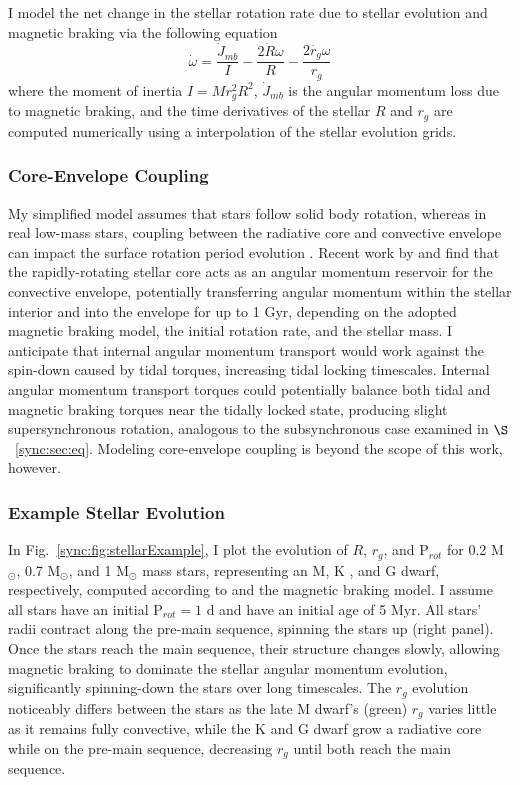 I model the net change in the stellar rotation rate due to stellar evolution and magnetic braking via the following equation 
\begin{equation} \label{sync:eqn:stellar_rot_rate_dt}
\dot{\omega} = \frac{\dot{J}_{mb}}{I} - \frac{2 \dot{R} \omega}{R} - \frac{2 \dot{r_g} \omega}{r_g}
\end{equation}
where the moment of inertia $I = M r_g^2 R^2$, $\dot{J}_{mb}$ is the angular momentum loss due to magnetic braking, and the time derivatives of the stellar $R$ and $r_g$ are computed numerically using a interpolation of the \citet{Baraffe2015} stellar evolution grids.  

\subsubsection{Core-Envelope Coupling} \label{sync:sec:methods:twoLayer}

My simplified model assumes that stars follow solid body rotation, whereas in real low-mass stars, coupling between the radiative core and convective envelope can impact the surface rotation period evolution \citep{MacGregor1991,Allain1998,Bouvier2008,Irwin2009}. Recent work by \citet{Gallet2013} and \citet{Gallet2015} find that the rapidly-rotating stellar core acts as an angular momentum reservoir for the convective envelope, potentially transferring angular momentum within the stellar interior and into the envelope for up to 1 Gyr, depending on the adopted magnetic braking model, the initial rotation rate, and the stellar mass. I anticipate that internal angular momentum transport would work against the spin-down caused by tidal torques, increasing tidal locking timescales. Internal angular momentum transport torques could potentially balance both tidal and magnetic braking torques near the tidally locked state, producing slight supersynchronous rotation, analogous to the subsynchronous case examined in $\S$~\ref{sync:sec:eq}. Modeling core-envelope coupling is beyond the scope of this work, however.

\subsubsection{Example Stellar Evolution} \label{sync:sec:methods:exampleStellar}

In Fig.~\ref{sync:fig:stellarExample}, I plot the evolution of $R$, $r_g$, and P$_{rot}$ for 0.2 M$_{\odot}$, 0.7 M$_{\odot}$, and 1 M$_{\odot}$ mass stars, representing an M, K , and G dwarf, respectively, computed according to \stellar and the \citet{Matt2015} magnetic braking model. I assume all stars have an initial P$_{rot} = 1$ d and have an initial age of 5 Myr. All stars' radii contract along the pre-main sequence, spinning the stars up (right panel). Once the stars reach the main sequence, their structure changes slowly, allowing magnetic braking to dominate the stellar angular momentum evolution, significantly spinning-down the stars over long timescales. The $r_g$ evolution noticeably differs between the stars as the late M dwarf's (green) $r_g$ varies little as it remains fully convective, while the K and G dwarf grow a radiative core while on the pre-main sequence, decreasing $r_g$ until both reach the main sequence.

